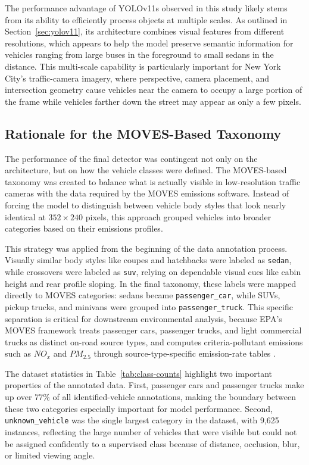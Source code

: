 The performance advantage of YOLOv11s observed in this study likely stems from its 
ability to efficiently process objects at multiple scales. As outlined in 
Section~\ref{sec:yolov11}, its architecture combines visual features from different resolutions, 
which appears to help the model preserve semantic information for vehicles ranging 
from large buses in the foreground to small sedans in the distance. This multi-scale
capability is particularly important for New York City's traffic-camera imagery, where
perspective, camera placement, and intersection geometry cause vehicles near the camera
to occupy a large portion of the frame while vehicles farther down the street may appear
as only a few pixels.


\subsection{Rationale for the MOVES-Based Taxonomy}

The performance of the final detector was contingent not only on the architecture,
but on how the vehicle classes were defined. The MOVES-based taxonomy was created 
to balance what is actually visible in low-resolution traffic cameras with the data
required by the MOVES emissions software. Instead of forcing the model to distinguish
between vehicle body styles that look nearly identical at $352 \times 240$ pixels, this
approach grouped vehicles into broader categories based on their emissions profiles.

This strategy was applied from the beginning of the data annotation process. 
Visually similar body styles like coupes and hatchbacks were labeled as \verb|sedan|,
while crossovers were labeled as \verb|suv|, relying on dependable visual cues 
like cabin height and rear profile sloping. In the final taxonomy, these labels were 
mapped directly to MOVES categories: sedans became \verb|passenger_car|, while SUVs,
pickup trucks, and minivans were grouped into \verb|passenger_truck|. This specific 
separation is critical for downstream environmental analysis, because EPA's MOVES 
framework treats passenger cars, passenger trucks, and light commercial trucks as 
distinct on-road source types, and computes criteria-pollutant emissions such as $NO_{x}$
and $PM_{2.5}$ through source-type-specific emission-rate tables 
\cite{us_epa_moves3_2020, USEPA_overview_2025}.

The dataset statistics in Table~\ref{tab:class-counts} highlight two important properties
of the annotated data. First, passenger cars and passenger trucks make up over 77\% of all
identified-vehicle annotations, making the boundary between these two categories especially
important for model performance. Second, \verb|unknown_vehicle| was the single largest
category in the dataset, with 9,625 instances, reflecting the large number of vehicles that
were visible but could not be assigned confidently to a supervised class because of distance,
occlusion, blur, or limited viewing angle.

